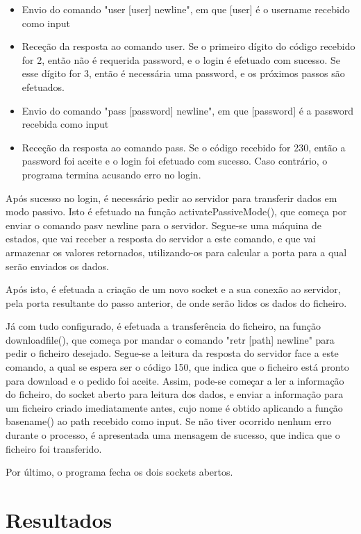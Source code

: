 \documentclass[article, a4paper, 11pt, oneside]{memoir}
\begin{document}
\begin{itemize}
  \item Envio do comando "user [user] newline", em que [user] é o username recebido como input
  \item Receção da resposta ao comando user. Se o primeiro dígito do código recebido for 2, então não é requerida password, e o login é efetuado com sucesso. Se esse dígito for 3, então é necessária uma password, e os próximos passos são efetuados.
  \item Envio do comando "pass [password] newline", em que [password] é a password recebida como input
  \item Receção da resposta ao comando pass. Se o código recebido for 230, então a password foi aceite e o login foi efetuado com sucesso. Caso contrário, o programa termina acusando erro no login.
\end{itemize}

Após sucesso no login, é necessário pedir ao servidor para transferir dados em modo passivo. Isto é efetuado na função activatePassiveMode(), que começa por enviar o comando 
pasv newline para o servidor.
Segue-se uma máquina de estados, que vai receber a resposta do servidor a este comando, e que vai armazenar os valores retornados, 
utilizando-os para calcular a porta para a qual serão enviados os dados. 

Após isto, é efetuada a criação de um novo socket e a sua conexão ao servidor, 
pela porta resultante do passo anterior, de onde serão lidos os dados do ficheiro.

Já com tudo configurado, é efetuada a transferência do ficheiro, na função download\textunderscore file(), que começa por mandar
o comando "retr [path] newline" para pedir o ficheiro desejado. Segue-se a leitura da resposta do servidor face a este comando,
a qual se espera ser o código 150, que indica que o ficheiro está pronto para download e o pedido foi aceite. 
Assim, pode-se começar a ler a informação do ficheiro, do socket aberto para leitura dos dados, e enviar a informação para um ficheiro criado imediatamente antes,
cujo nome é obtido aplicando a função basename() ao path recebido como input. Se não tiver ocorrido nenhum erro durante o processo, é apresentada uma mensagem de sucesso,
que indica que o ficheiro foi transferido. 

Por último, o programa fecha os dois sockets abertos.

\section{Resultados}
\end{document}
